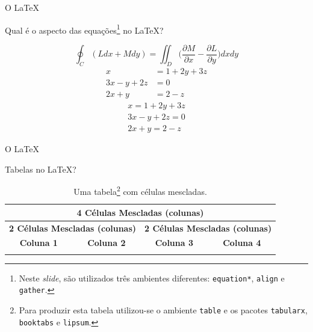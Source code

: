 \documentclass[10pt]{beamer}
\begin{document}
\begin{frame}{O \LaTeX{}}
	\begin{block}{Qual é o aspecto das equações\footnote{Neste \textit{slide}, são utilizados três ambientes diferentes: {\tt equation*}, {\tt align} e {\tt gather}.} no \LaTeX{}?}
	    \vspace{-1em}
		\begin{center}
		        \begin{equation*}
		            \oint_C (Ldx + Mdy) = \iint_D \bigg(\frac{\partial{M}}{\partial{x}} - \frac{\partial{L}}{\partial{y}}\bigg)dxdy
		        \end{equation*}
			\vspace{-1em}
			\begin{align}
 				x            & = 1 + 2y + 3z \\ 
				3x -  y + 2z & = 0           \\
				2x +  y      & = 2 - z             
			\end{align}
			\vspace{-1em}		
			\begin{gather}
				x            = 1 + 2y + 3z \\ 
				3x -  y + 2z = 0           \\
				2x +  y      = 2 - z
			\end{gather}	
		\end{center}		
	\end{block}
\end{frame}

\begin{frame}[fragile]{O \LaTeX{}}
	\begin{block}{Tabelas no \LaTeX{}?}
		\begin{table}
			\scriptsize
			\caption{Uma tabela\footnote{Para produzir esta tabela utilizou-se o ambiente {\tt table} e os pacotes {\tt tabularx}, {\tt booktabs} e {\tt lipsum}.} com células mescladas.}
			\begin{tabularx}{\textwidth}{X X X X}
				\toprule
				\multicolumn{4}{c}{\textbf{4 Células Mescladas (colunas)}} \\
				\midrule
				\multicolumn{2}{c}{\textbf{2 Células Mescladas (colunas)}} & \multicolumn{2}{c}{\textbf{2 Células Mescladas (colunas)}} \\
				\midrule
				\multicolumn{1}{c}{\textbf{Coluna 1}} & \multicolumn{1}{c}{\textbf{Coluna 2}} & 
				\multicolumn{1}{c}{\textbf{Coluna 3}} & \multicolumn{1}{c}{\textbf{Coluna 4}} \\
				\midrule
				\lipsumsentence[1-2] & \lipsumsentence[3-4] & \lipsumsentence[5-6] & \lipsumsentence[7-8] \\
				\bottomrule
			\end{tabularx}
		\end{table}
	\end{block}
\end{frame}
\end{document}
